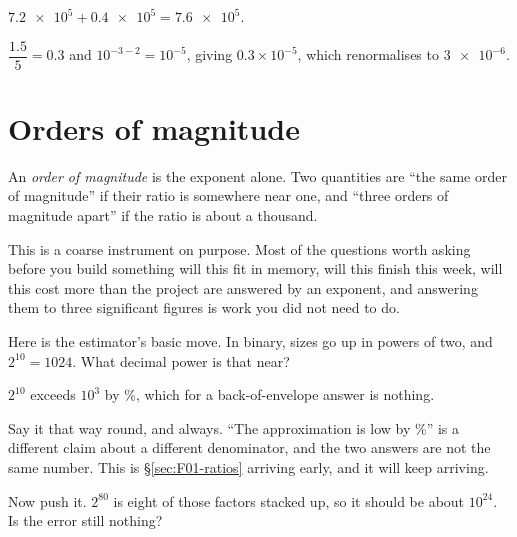 \begin{fr}
\begin{ansblock}
$\num{7.2e5} + \num{0.4e5} = \num{7.6e5}$.

$\dfrac{\num{1.5}}{5} = \num{0.3}$ and $10^{-3-2} = 10^{-5}$, giving $\num{0.3} \times 10^{-5}$,
which renormalises to $\num{3e-6}$.
\end{ansblock}
\end{fr}

\section{Orders of magnitude}
\label{sec:F01-magnitudes}

\begin{fr}
An \emph{order of magnitude} is the exponent alone. Two quantities are
\enquote{the same order of magnitude} if their ratio is somewhere near one, and
\enquote{three orders of magnitude apart} if the ratio is about a thousand.

This is a coarse instrument on purpose. Most of the questions worth asking
before you build something \dash{} will this fit in memory, will this finish
this week, will this cost more than the project \dash{} are answered by an
exponent, and answering them to three significant figures is work you did not
need to do.

Here is the estimator's basic move. In binary, sizes go up in powers of two,
and $2^{10} = 1024$. What decimal power is that near?
\nextframe
\end{fr}

\begin{fr}
$2^{10}$ exceeds $10^{3}$ by \%, which for a
back-of-envelope answer is nothing.

Say it that way round, and always. \enquote{The approximation is low by
\%} is a different claim about a different
denominator, and the two answers are not the same number. This is
\S\ref{sec:F01-ratios} arriving early, and it will keep arriving.

Now push it. $2^{80}$ is eight of those factors stacked up, so it should be
about $10^{24}$. Is the error still nothing?
\nextframe
\end{fr}

